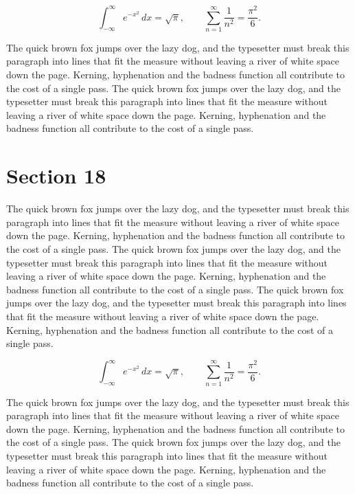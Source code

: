 \documentclass{article}
\begin{document}
\begin{equation}
\int_{-\infty}^{\infty} e^{-x^{2}}\,dx = \sqrt{\pi}, \qquad
\sum_{n=1}^{\infty} \frac{1}{n^{2}} = \frac{\pi^{2}}{6}.
\end{equation}

The quick brown fox jumps over the lazy dog, and the typesetter must break this paragraph into lines that fit the measure without leaving a river of white space down the page. Kerning, hyphenation and the badness function all contribute to the cost of a single pass. The quick brown fox jumps over the lazy dog, and the typesetter must break this paragraph into lines that fit the measure without leaving a river of white space down the page. Kerning, hyphenation and the badness function all contribute to the cost of a single pass. 
\section{Section 18}
The quick brown fox jumps over the lazy dog, and the typesetter must break this paragraph into lines that fit the measure without leaving a river of white space down the page. Kerning, hyphenation and the badness function all contribute to the cost of a single pass. The quick brown fox jumps over the lazy dog, and the typesetter must break this paragraph into lines that fit the measure without leaving a river of white space down the page. Kerning, hyphenation and the badness function all contribute to the cost of a single pass. The quick brown fox jumps over the lazy dog, and the typesetter must break this paragraph into lines that fit the measure without leaving a river of white space down the page. Kerning, hyphenation and the badness function all contribute to the cost of a single pass. 

\begin{equation}
\int_{-\infty}^{\infty} e^{-x^{2}}\,dx = \sqrt{\pi}, \qquad
\sum_{n=1}^{\infty} \frac{1}{n^{2}} = \frac{\pi^{2}}{6}.
\end{equation}

The quick brown fox jumps over the lazy dog, and the typesetter must break this paragraph into lines that fit the measure without leaving a river of white space down the page. Kerning, hyphenation and the badness function all contribute to the cost of a single pass. The quick brown fox jumps over the lazy dog, and the typesetter must break this paragraph into lines that fit the measure without leaving a river of white space down the page. Kerning, hyphenation and the badness function all contribute to the cost of a single pass. 
\end{document}
